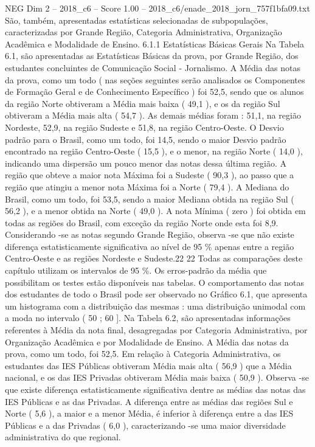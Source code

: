 \begin{textsample}{NEG Dim 2 – 2018\_c6 – Score 1.00 – 2018\_c6/enade\_2018\_jorn\_757f1bfa09.txt}
São, também, apresentadas estatísticas selecionadas de subpopulações, caracterizadas por Grande Região, Categoria Administrativa, Organização Acadêmica e Modalidade de Ensino. 6.1.1 Estatísticas Básicas Gerais Na Tabela 6.1, são apresentadas as Estatísticas Básicas da prova, por Grande Região, dos estudantes concluintes de Comunicação Social - Jornalismo.
A Média das notas da prova, como um todo ( nas seções seguintes serão analisados os Componentes de Formação Geral e de Conhecimento Específico ) foi 52,5, sendo que os alunos da região Norte obtiveram a Média mais baixa ( 49,1 ), e os da região Sul obtiveram a Média mais alta ( 54,7 ).
As demais médias foram : 51,1, na região Nordeste, 52,9, na região Sudeste e 51,8, na região Centro-Oeste.
O Desvio padrão para o Brasil, como um todo, foi 14,5, sendo o maior Desvio padrão encontrado na região Centro-Oeste ( 15,5 ), e o menor, na região Norte ( 14,0 ), indicando uma dispersão um pouco menor das notas dessa última região.
A região que obteve a maior nota Máxima foi a Sudeste ( 90,3 ), ao passo que a região que atingiu a menor nota Máxima foi a Norte ( 79,4 ).
A Mediana do Brasil, como um todo, foi 53,5, sendo a maior Mediana obtida na região Sul ( 56,2 ), e a menor obtida na Norte ( 49,0 ).
A nota Mínima ( zero ) foi obtida em todas as regiões do Brasil, com exceção da região Norte onde esta foi 8,9.
Considerando -se as notas segundo Grande Região, observa -se que não existe diferença estatisticamente significativa ao nível de 95 \% apenas entre a região Centro-Oeste e as regiões Nordeste e Sudeste.22 22 Todas as comparações deste capítulo utilizam os intervalos de 95 \%.
Os erros-padrão da média que possibilitam os testes estão disponíveis nas tabelas.
O comportamento das notas dos estudantes de todo o Brasil pode ser observado no Gráfico 6.1, que apresenta um histograma com a distribuição das mesmas : uma distribuição unimodal com a moda no intervalo ( 50 ; 60 ].
Na Tabela 6.2, são apresentadas informações referentes à Média da nota final, desagregadas por Categoria Administrativa, por Organização Acadêmica e por Modalidade de Ensino.
A Média das notas da prova, como um todo, foi 52,5.
Em relação à Categoria Administrativa, os estudantes das IES Públicas obtiveram Média mais alta ( 56,9 ) que a Média nacional, e os das IES Privadas obtiveram Média mais baixa ( 50,9 ).
Observa -se que existe diferença estatisticamente significativa dentre as médias das notas das IES Públicas e as das Privadas.
A diferença entre as médias das regiões Sul e Norte ( 5,6 ), a maior e a menor Média, é inferior à diferença entre a das IES Públicas e a das Privadas ( 6,0 ), caracterizando -se uma maior diversidade administrativa do que regional.

\end{textsample}
